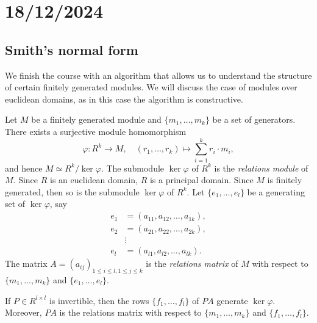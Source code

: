 \section{18/12/2024}

\subsection{Smith's normal form}

We finish the course with an algorithm that allows us to understand the
structure of certain finitely generated modules.  We will discuss the case of
modules over euclidean domains, as in this case the algorithm is constructive. 


Let $M$ be a finitely generated module and $\{m_1,\dots,m_k\}$ be a set of
generators.  There exists a surjective module homomorphism 
\[
	\varphi\colon R^k\to M, 
	\quad
	(r_1,\dots,r_k)\mapsto \sum_{i=1}^k r_i\cdot m_i,
\]
and hence 
$M\simeq R^k/\ker\varphi$. 
The submodule $\ker\varphi$ of $R^k$ is the \emph{relations module} of $M$. 
Since $R$ is an euclidean domain, $R$ is a principal domain. Since 
$M$ is finitely generated, then so is the submodule $\ker\varphi$ of $R^k$. Let 
$\{e_1,\dots,e_l\}$ be a generating set of $\ker\varphi$, say 
\begin{align*}
e_1&=(a_{11},a_{12},\dots,a_{1k}),\\
e_2&=(a_{21},a_{22},\dots,a_{2k}),\\
&\vdots\\
e_l&=(a_{l1},a_{l2},\dots,a_{lk}).	
\end{align*}
The matrix $A=(a_{ij})_{1\leq i\leq l,1\leq j\leq k}$ is the 
\emph{relations matrix} of $M$ with respect to $\{m_1,\dots,m_k\}$ 
and $\{e_1,\dots,e_l\}$. 

\begin{claim}
		If $P\in R^{l\times l}$ is invertible, then the rows
		$\{f_1,\dots,f_l\}$ of $PA$ generate $\ker\varphi$. Moreover, $PA$ is
		the relations matrix with respect to $\{m_1,\dots,m_k\}$ and
		$\{f_1,\dots,f_l\}$. 
\end{claim}


